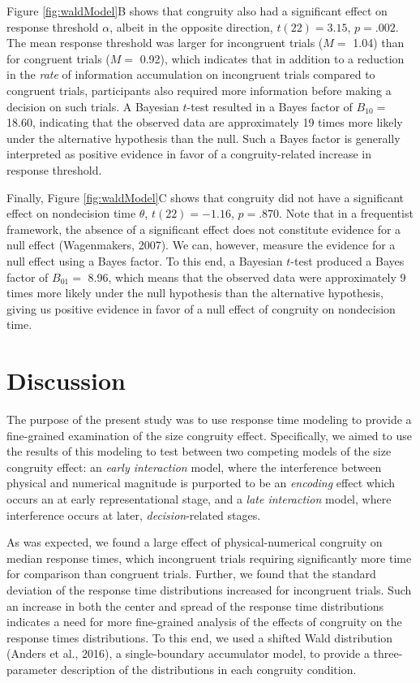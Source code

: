 \documentclass[english,man]{apa6}
\theoremstyle{definition}
\theoremstyle{definition}
\theoremstyle{definition}
\theoremstyle{remark}
\begin{document}
Figure \ref{fig:waldModel}B shows that congruity also had a significant
effect on response threshold \(\alpha\), albeit in the opposite
direction, \(t(22) = 3.15\), \(p = .002\). The mean response threshold
was larger for incongruent trials (\(M=\) 1.04) than for congruent
trials (\(M=\) 0.92), which indicates that in addition to a reduction in
the \emph{rate} of information accumulation on incongruent trials
compared to congruent trials, participants also required more
information before making a decision on such trials. A Bayesian
\(t\)-test resulted in a Bayes factor of \(B_{10}=\) 18.60, indicating
that the observed data are approximately 19 times more likely under the
alternative hypothesis than the null. Such a Bayes factor is generally
interpreted as positive evidence in favor of a congruity-related
increase in response threshold.

Finally, Figure \ref{fig:waldModel}C shows that congruity did not have a
significant effect on nondecision time \(\theta\), \(t(22) = -1.16\),
\(p = .870\). Note that in a frequentist framework, the absence of a
significant effect does not constitute evidence for a null effect
(Wagenmakers, 2007). We can, however, measure the evidence for a null
effect using a Bayes factor. To this end, a Bayesian \(t\)-test produced
a Bayes factor of \(B_{01}=\) 8.96, which means that the observed data
were approximately 9 times more likely under the null hypothesis than
the alternative hypothesis, giving us positive evidence in favor of a
null effect of congruity on nondecision time.

\section{Discussion}\label{discussion}

The purpose of the present study was to use response time modeling to
provide a fine-grained examination of the size congruity effect.
Specifically, we aimed to use the results of this modeling to test
between two competing models of the size congruity effect: an
\emph{early interaction} model, where the interference between physical
and numerical magnitude is purported to be an \emph{encoding} effect
which occurs an at early representational stage, and a \emph{late
interaction} model, where interference occurs at later,
\emph{decision}-related stages.

As was expected, we found a large effect of physical-numerical congruity
on median response times, which incongruent trials requiring
significantly more time for comparison than congruent trials. Further,
we found that the standard deviation of the response time distributions
increased for incongruent trials. Such an increase in both the center
and spread of the response time distributions indicates a need for more
fine-grained analysis of the effects of congruity on the response times
distributions. To this end, we used a shifted Wald distribution (Anders
et al., 2016), a single-boundary accumulator model, to provide a
three-parameter description of the distributions in each congruity
condition.
\end{document}
